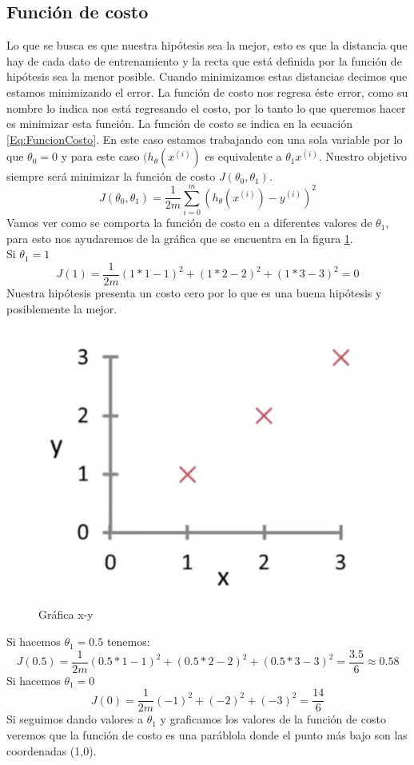 \documentclass{book}
\begin{document}
\subsection{Función de costo}
Lo que se busca es que nuestra hipótesis sea la mejor, esto es que la distancia que hay de cada dato de entrenamiento y la recta que está definida por la función de hipótesis sea la menor posible. Cuando minimizamos estas distancias decimos que estamos minimizando el error. La función de costo nos regresa éste error, como su nombre lo indica nos está regresando el costo, por lo tanto lo que queremos hacer es minimizar esta función. La función de costo se indica en la ecuación \ref{Eq:FuncionCosto}. En este caso estamos trabajando con una sola variable por lo que $\theta_0=0$ y para este caso $(h_\theta(x^{(i)})$ es equivalente a $\theta_1x^{(i)}$. Nuestro objetivo siempre será minimizar la función de costo $J(\theta_0, \theta_1)$.
\begin{equation}
	J(\theta_0, \theta_1)=\frac{1}{2m}\sum_{i=0}^{m}(h_\theta(x^{(i)})-y^{(i)})^2
	\label{Eq:FuncionCosto}
\end{equation}
Vamos ver como se comporta la función de costo en a diferentes valores de $\theta_1$, para esto nos ayudaremos de la gráfica que se encuentra en la figura \ref{Fig:G1}.\\
Si $\theta_1=1$
\[
J(1)=\frac{1}{2m}(1*1-1)^2+(1*2-2)^2+(1*3-3)^2=0
\]
Nuestra hipótesis presenta un costo cero por lo que es una buena hipótesis y posiblemente la mejor.
\begin{figure}[hb]
	\centering
	\includegraphics[scale=0.25]{img/Grafica}
	\caption{Gráfica x-y}
	\label{Fig:G1}
\end{figure}
Si hacemos $\theta_1=0.5$ tenemos:
\[
	J(0.5)=\frac{1}{2m}(0.5*1-1)^2+(0.5*2-2)^2+(0.5*3-3)^2=\frac{3.5}{6}\approx0.58
\]
Si hacemos $\theta_1=0$
\[
J(0)=\frac{1}{2m}(-1)^2+(-2)^2+(-3)^2=\frac{14}{6}
\]
Si seguimos dando valores a $\theta_1$ y graficamos los valores de la función de costo veremos que la función de costo es una paráblola donde el punto más bajo son las coordenadas (1,0).
\end{document}
